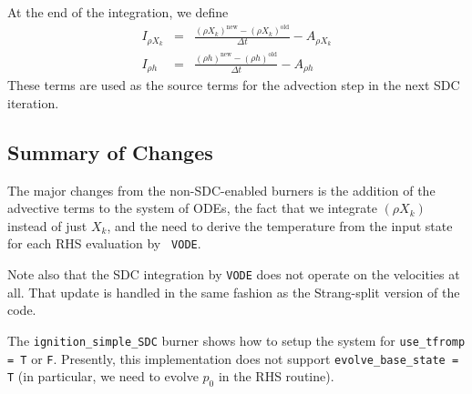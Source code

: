 At the end of the integration, we define 
\begin{eqnarray}
I_{\rho X_k} &=& \frac{(\rho X_k)^\mathrm{new} - (\rho X_k)^\mathrm{old}}{\Delta t} - A_{\rho X_k} \\
I_{\rho h}  &=& \frac{(\rho h)^\mathrm{new} - (\rho h)^\mathrm{old}}{\Delta t} - A_{\rho h}
\end{eqnarray}
These terms are used as the source terms for the advection step in the
next SDC iteration.

\subsection{Summary of Changes}
The major changes from the non-SDC-enabled burners is the addition of
the advective terms to the system of ODEs, the fact that we integrate
$(\rho X_k)$ instead of just $X_k$, and the need to derive the
temperature from the input state for each RHS evaluation by {\tt
  VODE}.

Note also that the SDC integration by {\tt VODE} does not operate on 
the velocities at all.  That update is handled in the same fashion 
as the Strang-split version of the code.

The {\tt ignition\_simple\_SDC} burner shows how to setup the system
for {\tt use\_tfromp = T} or {\tt F}.  Presently, this implementation
does not support {\tt evolve\_base\_state = T} (in particular, we 
need to evolve $p_0$ in the RHS routine).
